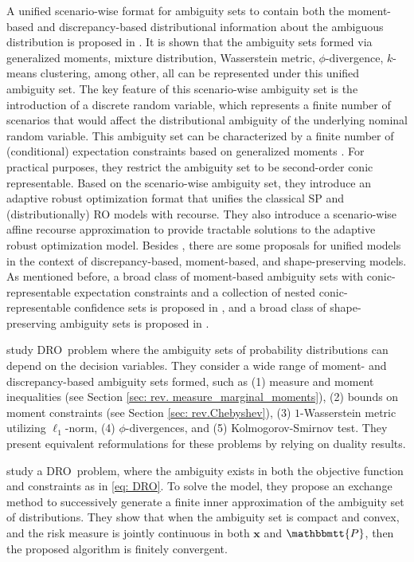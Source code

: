\documentclass[final,onefignum,onetabnum]{class}
\newcommand{\bs}[1]{\boldsymbol{#1}} %
\newcommand{\Ts}[1]{\mathbbmtt{#1}} %
\newcommand{\dro}{DRO}
\begin{document}
A unified scenario-wise format for ambiguity sets to contain both the moment-based and discrepancy-based distributional information about the ambiguous distribution is proposed in \citet{chen2018adaptive}. It is shown that the ambiguity sets formed via generalized moments, mixture distribution, Wasserstein
metric, $\phi$-divergence, $k$-means clustering, among other, all can be  represented under this unified ambiguity set.  The key feature of
this scenario-wise ambiguity set is the introduction of a discrete random variable, which represents
a finite number of scenarios that would affect the distributional ambiguity of the underlying nominal random
variable. This  ambiguity set can be characterized by a finite number of (conditional) expectation constraints based on
generalized moments \citet{wiesemann2014}. For practical purposes, they restrict the ambiguity set to be second-order conic  representable. Based on the scenario-wise ambiguity set, they introduce an adaptive robust optimization format that unifies the  classical SP and (distributionally) RO
models with recourse. They also introduce a  scenario-wise affine recourse approximation to provide tractable solutions to
the adaptive robust optimization model. 
Besides \citet{chen2018adaptive}, there are some proposals for unified models in the context of discrepancy-based, moment-based,  and shape-preserving models. As mentioned before, a broad class of moment-based ambiguity
sets with conic-representable expectation constraints and a collection of nested conic-representable
confidence sets is proposed in \citet{wiesemann2014}, and a broad class of shape-preserving ambiguity sets is proposed in \citet{hanasusanto2015chance}. 



\citet{luo2018} study \dro\  problem where the ambiguity sets of probability distributions can depend on the decision variables. They consider a wide range of moment- and discrepancy-based ambiguity sets formed, such as (1)  measure and moment inequalities (see Section \ref{sec: rev. measure_marginal_moments}), (2) bounds on moment constraints (see Section \ref{sec: rev.Chebyshev}), (3)  $1$-Wasserstein metric utilizing $\ell_1$-norm, (4) $\phi$-divergences, and (5) Kolmogorov-Smirnov test. They present equivalent reformulations for these problems by relying on  duality results. 

\citet{pflug2007} study a \dro\ problem, where the ambiguity exists in both the objective function and constraints as in \eqref{eq: DRO}. To solve the model, they propose an exchange method to  successively   %
generate a finite inner approximation of the ambiguity
set of distributions. They show that when the ambiguity set is compact and convex, and the risk measure is jointly continuous in both $\bs{x}$ and $\Ts{P}$, then the proposed algorithm is finitely convergent. 
\end{document}
